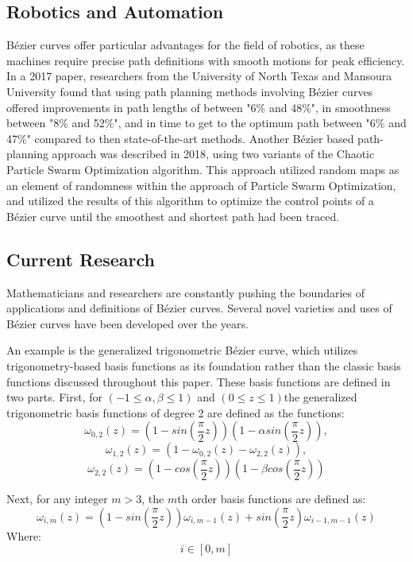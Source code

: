 \documentclass{article}
\begin{document}
\subsection{Robotics and Automation}
Bézier curves offer particular advantages for the field of robotics, as these machines require precise path definitions with smooth motions for peak efficiency. In a 2017 paper, researchers from the University of North Texas and Mansoura University found that using path planning methods involving Bézier curves offered improvements in path lengths of between "6\% and 48\%", in smoothness between "8\% and 52\%", and in time to get to the optimum path between "6\% and 47\%" compared to then state-of-the-art methods.\cite{elhoseny-shehab-yuan17} Another Bézier based path-planning approach was described in 2018, using two variants of the Chaotic Particle Swarm Optimization algorithm. This approach utilized random maps as an element of randomness within the approach of Particle Swarm Optimization, and utilized the results of this algorithm to optimize the control points of a Bézier curve until the smoothest and shortest path had been traced.\cite{cpso19} 

\subsection{Current Research}
Mathematicians and researchers are constantly pushing the boundaries of applications and definitions of Bézier curves. Several novel varieties and uses of Bézier curves have been developed over the years. 

An example is the generalized trigonometric Bézier curve, which utilizes trigonometry-based basis functions as its foundation rather than the classic basis functions discussed throughout this paper. These basis functions are defined in two parts. First, for $(-1\leq\alpha,\beta\leq1)$ and $(0\leq z \leq1)$the generalized trigonometric basis functions of degree 2 are defined as the functions:
$$\omega_{0,2}(z) = (1-sin(\frac{\pi}{2}z))(1-\alpha sin(\frac{\pi}{2}z)),$$
$$\omega_{1,2}(z) = (1-\omega_{0,2}(z)-\omega_{2,2}(z)),$$
$$\omega_{2,2}(z) = (1-cos(\frac{\pi}{2}z))(1-\beta cos(\frac{\pi}{2}z))$$

Next, for any integer $m>3$, the $m$th order basis functions are defined as:
$$\omega_{i,m}(z)=(1-sin(\frac{\pi}{2}z))\omega_{i,m-1}(z)+sin(\frac{\pi}{2}z)\omega_{i-1, m-1}(z)$$ Where: $$i\in[0,m]$$
\cite{abbas-maqsood-hu-ramli-miura20}
\end{document}
